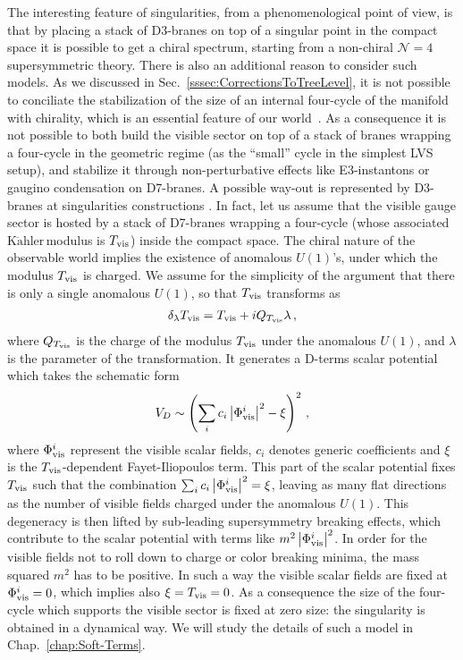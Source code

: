 \documentclass[12pt,a4paper]{book}
\newcommand{\Kahler}{\ensuremath{\text{K}\ddot{\text{a}}\text{hler}\,}}
\begin{document}
The interesting feature of singularities, from a phenomenological point of view, is that by placing a stack of D3-branes on top of a singular point in the compact space it is possible to get a chiral spectrum, starting from a non-chiral $\mathcal{N} = 4$ supersymmetric theory. There is also an additional reason to consider such models. As we discussed in Sec.~\ref{sssec:CorrectionsToTreeLevel}, it is not possible to conciliate the stabilization of the size of an internal four-cycle of the manifold with chirality, which is an essential feature of our world~\cite{Blumenhagen:2007sm}. As a consequence it is not possible to both build the visible sector on top of a stack of branes wrapping a four-cycle in the geometric regime (as the ``small'' cycle in the simplest LVS setup), and stabilize it through non-perturbative effects like E$3$-instantons or gaugino condensation on D7-branes. A possible way-out is represented by D3-branes at singularities constructions \cite{Conlon:2008wa}. In fact, let us assume that the visible gauge sector is hosted by a stack of D7-branes wrapping a four-cycle (whose associated \Kahler modulus is $T_{\rm vis}$) inside the compact space. The chiral nature of the observable world implies the existence of anomalous $U(1)$'s, under which the modulus $T_{\rm vis}$ is charged. We assume for the simplicity of the argument that there is only a single anomalous $U(1)$, so that $T_{\rm vis}$ transforms as
\begin{align}
\label{eq:ChargedVisibleModulus}
\delta_\lambda T_{\rm vis} = T_{\rm vis} + i Q_{T_{\rm vis}} \lambda\,,
\end{align}
where $Q_{T_{\rm vis}}$ is the charge of the modulus $T_{\rm vis}$ under the anomalous $U(1)$, and $\lambda$ is the parameter of the transformation. It generates a D-terms scalar potential which takes the schematic form
\begin{align}
\label{eq:DTermPotential}
V_D \sim \left(\sum_i c_i \left|\Phi^i_{\rm vis}\right|^2 - \xi\right)^2\,,
\end{align}
where $\Phi^i_{\rm vis}$ represent the visible scalar fields, $c_i$ denotes generic coefficients and $\xi$ is the $T_{\rm vis}$-dependent Fayet-Iliopoulos term. This part of the scalar potential fixes $T_{\rm vis}$ such that the combination $\sum_i c_i \left|\Phi^i_{\rm vis}\right|^2 = \xi$, leaving as many flat directions as the number of visible fields charged under the anomalous $U(1)$. This degeneracy is then lifted by sub-leading supersymmetry breaking effects, which contribute to the scalar potential with terms like $m^2 \left|\Phi^i_{\rm vis}\right|^2$. In order for the visible fields not to roll down to charge or color breaking minima, the mass squared $m^2$ has to be positive. In such a way the visible scalar fields are fixed at $\Phi^i_{\rm vis} = 0$, which implies also $\xi = T_{\rm vis} = 0$. As a consequence the size of the four-cycle which supports the visible sector is fixed at zero size: the singularity is obtained in a dynamical way. We will study the details of such a model in Chap.~\ref{chap:Soft-Terms}.\\
\end{document}
